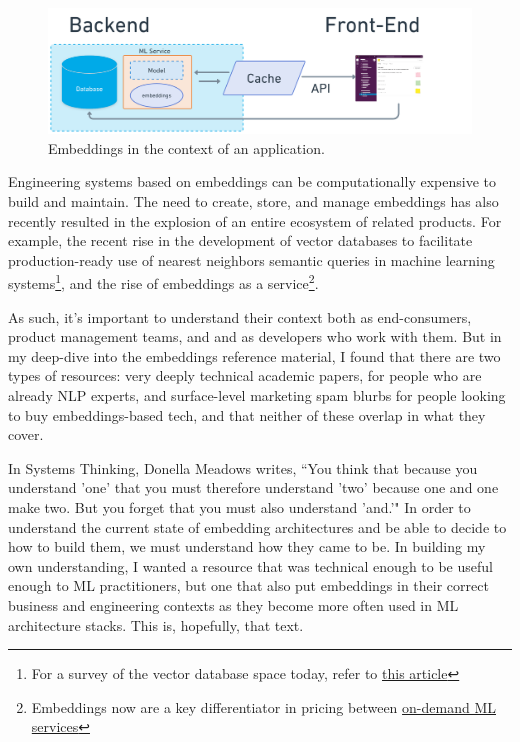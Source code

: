 \documentclass[11pt, table]{diazessay} %
\begin{document}
\begin{sloppypar}
\begin{figure}[H]
\centering
\includegraphics[width=1\textwidth]{figures/web_service_ml.png}
\caption{Embeddings in the context of an application.}
\end{figure}


Engineering systems based on embeddings can be computationally expensive to build and maintain\citep{sharir2020cost}. The need to create, store, and manage embeddings has also recently resulted in the explosion of an entire ecosystem of related products. For example, the recent rise in the development of vector databases to facilitate production-ready use of nearest neighbors semantic queries in machine learning systems\footnote{For a survey of the vector database space today, refer to  \href{https://dmitry-kan.medium.com/landscape-of-vector-databases-d241b279f486}{this article}}, and the rise of embeddings as a service\footnote{Embeddings now are a key differentiator in pricing between \href{https://openai.com/pricing}{on-demand ML services}}.

As such, it's important to understand their context both as end-consumers, product management teams, and and as developers who work with them. But in my deep-dive into the embeddings reference material, I found that there are two types of resources: very deeply technical academic papers, for people who are already NLP experts, and surface-level marketing spam blurbs for people looking to buy embeddings-based tech, and that neither of these overlap in what they cover.  

In Systems Thinking, Donella Meadows writes, “You think that because you understand 'one' that you must therefore understand 'two' because one and one make two. But you forget that you must also understand 'and.'"\citep{meadows2008thinking} In order to understand the current state of embedding architectures and be able to decide to how to build them, we must understand how they came to be. In building my own understanding, I wanted a resource that was technical enough to be useful enough to ML practitioners, but one that also put embeddings in their correct business and engineering contexts as they become more often used in ML architecture stacks. This is, hopefully, that text. 


\end{sloppypar}
\end{document}
